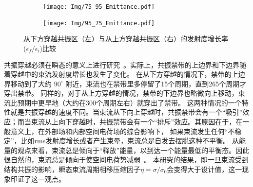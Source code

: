 \begin{figure}[thbp]
    \centering
    \begin{subfigure}[b]{0.48\textwidth}
        \centering
        \texttt{[image: Img/75\_95\_Emittance.pdf]}
        \caption{}
        \label{sfig:75_95emittance}
    \end{subfigure}
    \begin{subfigure}[b]{0.48\textwidth}
        \centering
        \texttt{[image: Img/95\_75\_Emittance.pdf]}
        \caption{}
        \label{sfig:95_75emittance}
    \end{subfigure}
    \caption{从下方穿越共振区（左）与从上方穿越共振区（右）的发射度增长率($\epsilon_f/\epsilon_i$)比较
     }
    \label{fig:emittance}
\end{figure}

共振穿越必须在瞬态的意义上进行研究~\cite{12}。实际上，共振禁带的上边界和下边界随着穿越中的束流发射度增长也发生了变化。
在从下方穿越的情况下，禁带的上边界移动到了大约 $90^{\circ}$ 附近，束流也在禁带里多停留了15个周期，直到265个周期才穿出禁带。
同样的，对于从上方穿越的情况，禁带的下边界也略微向上移动，束流比预期中更早地（大约在300个周期左右）就穿出了禁带。
这两种情况的一个特性就是共振穿越的速度不同。当束流从下向上穿越时，共振禁带会有一个“吸引”效应；而当束流从上向下穿越时，共振禁带会有一个“排斥”效应。其原因在于，在一般意义上，在外部场和内部空间电荷场的综合影响下，
如果束流发生任何“不稳定”，比如rms发射度增长或者产生束晕，束流总是自发去摆脱这种不平衡。
从能量的观点来看，束流总是倾向于“释放”能量，以到达一个能量最低的平衡态。因此很自然的，束流总是倾向于使空间电荷势减弱~\cite{17}。
本研究的结果，即一旦束流受到结构共振的影响，瞬态束流周期相移压缩因子$\eta=\sigma/\sigma_0$会变得大于设计值，这一现象印证了这一观点。

